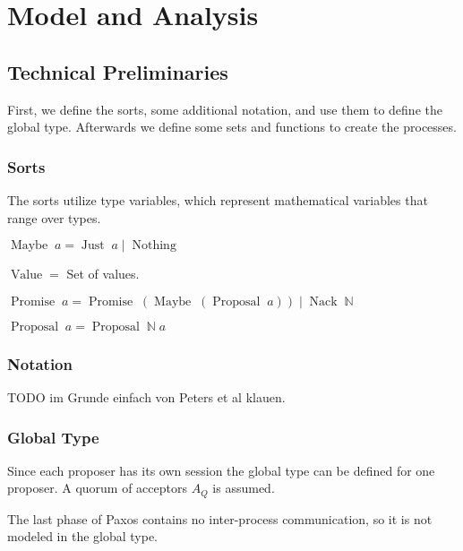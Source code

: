 \chapter{Model and Analysis}

\section{Technical Preliminaries}
First, we define the sorts, some additional notation, and use them to define the global type.
Afterwards we define some sets and functions to create the processes.

\subsection{Sorts}
The sorts utilize type variables, which represent mathematical variables that range over types.

\newcommand{\Maybe}[1]{\operatorname{Maybe}\; #1}
\newcommand{\Just}[1]{\operatorname{Just}\; #1}
\newcommand{\Nothing}[0]{\operatorname{Nothing}}
\newcommand{\Or}[0]{\; | \;}
\newcommand{\Promise}[1]{\operatorname{Promise}\; #1}
\newcommand{\Proposal}[1]{\operatorname{Proposal}\; #1}
\newcommand{\ProposalC}[2]{\operatorname{Proposal}\; #1\; #2}
\newcommand{\Nack}[1]{\operatorname{Nack}\; #1}
\newcommand{\Value}[0]{\operatorname{Value}}

$\Maybe{a} = \Just{a} \Or \Nothing$

$\Value =$ Set of values.

$\Promise{a} = \Promise{(\Maybe{(\Proposal{a})})} \Or \Nack{\mathbb{N}}$

$\Proposal{a} = \ProposalC{\mathbb{N}}{a}$

\subsection{Notation}
TODO im Grunde einfach von Peters et al klauen.

\subsection{Global Type}
\newcommand{\dotforall}[1]{\bigodot_{#1}\;}
\newcommand{\usendg}[4]{#1 \to_u #2 : #3 \left\langle #4 \right\rangle}
\newcommand{\wsendg}[3]{#1 \to_w #2 : #3}

Since each proposer has its own session the global type can be defined for one proposer.
A quorum of acceptors $A_Q$ is assumed.

The last phase of Paxos contains no inter-process communication, so it is not modeled in the global type.

